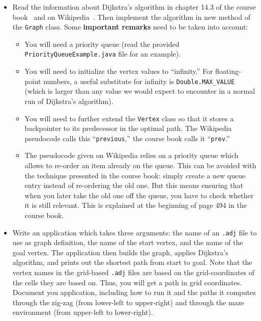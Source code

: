 \documentclass[a4paper,10pt]{article}
\begin{document}
\begin{itemize}
\item
  Read the information about Dijkstra's algorithm in chapter 14.3 of the course book~\cite{weiss:2005} and on Wikipedia~\cite{wikipedia:dijkstra}.
  Then implement the algorithm in new method of the \texttt{Graph} class.
  Some \textbf{important remarks} need to be taken into account:
  \begin{itemize}
  \item
    You will need a priority queue (read the provided \texttt{PriorityQueueExample.java} file for an example).
  \item
    You will need to initialize the vertex values to ``infinity.''
    For floating-point numbers, a useful substitute for infinity is \texttt{Double.MAX\_VALUE} (which is larger than any value we would expect to encounter in a normal run of Dijkstra's algorithm).
  \item
    You will need to further extend the \texttt{Vertex} class so that it stores a backpointer to its predecessor in the optimal path.
    The Wikipedia pseudocode calls this ``\texttt{previous},'' the course book calls it ``\texttt{prev}.''
  \item
    The pseudocode given on Wikipedia relies on a priority queue which allows to re-order an item already on the queue.
    This can be avoided with the technique presented in the course book:
    simply create a new queue entry instead of re-ordering the old one.
    But this means ensuring that when you later take the old one off the queue, you have to check whether it is still relevant.
    This is explained at the beginning of page 494 in the course book.
  \end{itemize}
  
\item
  Write an application which takes three arguments:
  the name of an \texttt{.adj} file to use as graph definition, the name of the start vertex, and the name of the goal vertex.
  The application then builds the graph, applies Dijkstra's algorithm, and prints out the shortest path from start to goal.
  Note that the vertex names in the grid-based \texttt{.adj} files are based on the grid-coordinates of the cells they are based on.
  Thus, you will get a path in grid coordinates.
  Document you application, including how to run it and the paths it computes through the zig-zag (from lower-left to upper-right) and through the maze environment (from upper-left to lower-right).
  
\end{itemize}
\end{document}
